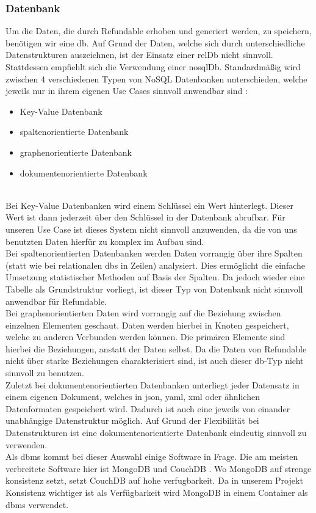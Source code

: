 		\subsubsection{Datenbank}
		\label{sec:db}
		Um die Daten, die durch Refundable erhoben und generiert werden, zu speichern, benötigen wir eine \gls{db}. Auf Grund der Daten, welche sich durch unterschiedliche Datenstrukturen auszeichnen, ist der Einsatz einer \gls{relDb} nicht sinnvoll. Stattdessen empfiehlt sich die Verwendung einer \gls{nosqlDb}.
		Standardmäßig wird zwischen 4 verschiedenen Typen von NoSQL Datenbanken unterschieden, welche jeweils nur in ihrem eigenen Use Cases sinnvoll anwendbar sind \cite{nosqltypes}:
		\begin{itemize}
			\item Key-Value Datenbank
			\item spaltenorientierte Datenbank
			\item graphenorientierte Datenbank
			\item dokumentenorientierte Datenbank
		\end{itemize}
		\label{code:nosqltypes}~\\	
		Bei Key-Value Datenbanken wird einem Schlüssel ein Wert hinterlegt. Dieser Wert ist dann jederzeit über den Schlüssel in der Datenbank abrufbar. Für unseren Use Case ist dieses System nicht sinnvoll anzuwenden, da die von uns benutzten Daten hierfür zu komplex im Aufbau sind.~\\
		Bei spaltenorientierten Datenbanken werden Daten vorrangig über ihre Spalten (statt wie bei relationalen \gls{db}s in Zeilen) analysiert. Dies ermöglicht die einfache Umsetzung statistischer Methoden auf Basis der Spalten. Da jedoch wieder eine Tabelle als Grundstruktur vorliegt, ist dieser Typ von Datenbank nicht sinnvoll anwendbar für Refundable.~\\
		Bei graphenorientierten Daten wird vorrangig auf die Beziehung zwischen einzelnen Elementen geschaut. Daten werden hierbei in Knoten gespeichert, welche zu anderen Verbunden werden können. Die primären Elemente sind hierbei die Beziehungen, anstatt der Daten selbst. Da die Daten von Refundable nicht über starke Beziehungen charakterisiert sind, ist auch dieser \gls{db}-Typ nicht sinnvoll zu benutzen.~\\		
		Zuletzt bei dokumentenorientierten Datenbanken unterliegt jeder Datensatz in einem eigenen Dokument, welches in \Gls{json}, \Gls{yaml}, \Gls{xml} oder ähnlichen Datenformaten gespeichert wird. Dadurch ist auch eine jeweils von einander unabhängige Datenstruktur möglich. Auf Grund der Flexibilität bei Datenstrukturen ist eine dokumentenorientierte Datenbank eindeutig sinnvoll zu verwenden.~\\
		Als \gls{dbms} kommt bei dieser Auswahl einige Software in Frage. Die am meisten verbreitete Software hier ist MongoDB und CouchDB \cite{mongo}. Wo MongoDB auf strenge \gls{konsistenz} setzt, setzt CouchDB auf hohe \gls{verfugbarkeit}. Da in unserem Projekt Konsistenz wichtiger ist als Verfügbarkeit wird MongoDB in einem Container als \gls{dbms} verwendet.
		
